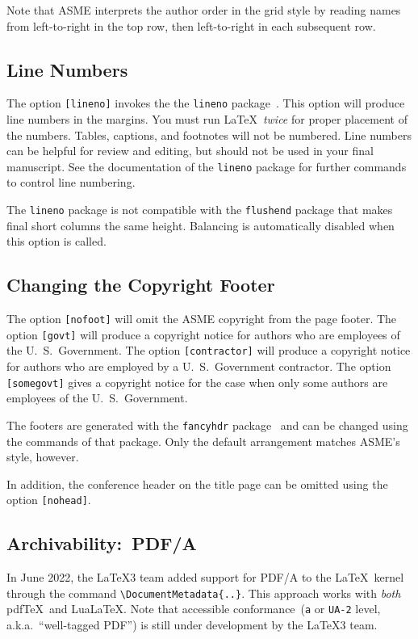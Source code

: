 \documentclass[colorlinks,upint,subscriptcorrection,varvw,balance,loadscripts,german,vietamese]{asmeconf} %
\newcommand*\pdfTeX{pdf\TeX}
\newcommand*\LuaLaTeX{Lua\LaTeX}
\begin{document}
Note that ASME interprets the author order in the grid style by reading names from left-to-right in the top row, then left-to-right in each subsequent row.

\subsection{Line Numbers} The option \texttt{[lineno]} invokes the the \texttt{lineno} package~\cite{bottcher}. This option will produce line numbers in the margins. You must run \LaTeX\ \emph{twice} for proper placement of the numbers. Tables, captions, and footnotes will not be numbered.  Line numbers can be helpful for review and editing, but should not be used in your final manuscript. See the documentation of the \texttt{lineno} package for further commands to control line numbering. 

The \texttt{lineno} package is not compatible with the \texttt{flushend} package that makes final short columns the same height. Balancing is automatically disabled when this option is called. 

\subsection{Changing the Copyright Footer} The option \texttt{[nofoot]} will omit the ASME copyright from the page footer. The option \texttt{[govt]} will produce a copyright notice for authors who are employees of the U.\ S.\ Government.  
The option \texttt{[contractor]} will produce a copyright
notice for authors who are employed by a U.\ S.\ Government contractor.
The option \texttt{[somegovt]} gives a copyright notice for the case when only some authors are employees of the U.\ S.\ Government.

The footers are generated with the \texttt{fancyhdr} package~\cite{oostrum} and can be changed using the commands of that package. Only the default arrangement matches ASME's style, however.

In addition, the conference header on the title page can be omitted using the option \texttt{[nohead]}.

\subsection{Archivability:~PDF/A} In June 2022, the \LaTeX{}3 team added support for PDF/A to the \LaTeX\ kernel through the command \verb|\DocumentMetadata{..}|. This approach works with \emph{both} \pdfTeX\  and \LuaLaTeX. Note that accessible  conformance~(\texttt{a} or \texttt{UA-2} level, a.k.a.\ ``well-tagged PDF'') is still under development by the  \LaTeX3 team.
\end{document}

